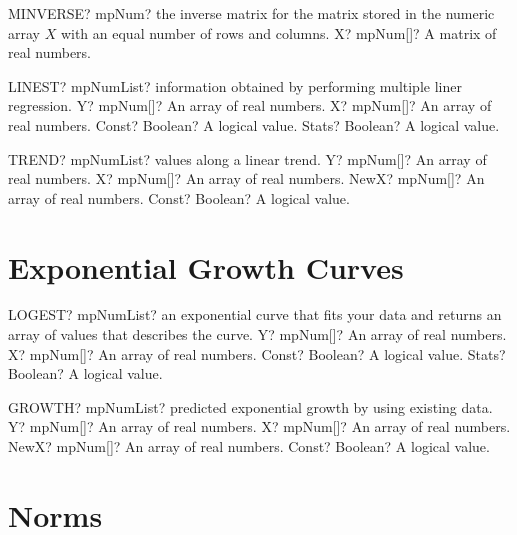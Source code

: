 \documentclass[12pt,a4paper,openany]{book}
\begin{document}
\begin{mpFunctionsExtract}
\mpWorksheetFunctionOneNotImplemented
{MINVERSE? mpNum? the  inverse matrix for the matrix stored in the numeric array  $X$ with an equal number of rows and columns.}
{X? mpNum[]? A matrix of real numbers.}
\end{mpFunctionsExtract}

\begin{mpFunctionsExtract}
\mpWorksheetFunctionFourNotImplemented
{LINEST? mpNumList? information obtained by performing multiple liner regression.}
{Y? mpNum[]? An array of real numbers.}
{X? mpNum[]? An array of real numbers.}
{Const? Boolean? A logical value.}
{Stats? Boolean? A logical value.}
\end{mpFunctionsExtract}

\begin{mpFunctionsExtract}
\mpWorksheetFunctionFourNotImplemented
{TREND? mpNumList? values along a linear trend.}
{Y? mpNum[]? An array of real numbers.}
{X? mpNum[]? An array of real numbers.}
{NewX? mpNum[]? An array of real numbers.}
{Const? Boolean? A logical value.}
\end{mpFunctionsExtract}

\section{Exponential Growth Curves}

\begin{mpFunctionsExtract}
\mpWorksheetFunctionFourNotImplemented
{LOGEST? mpNumList? an exponential curve that fits your data and returns an array of values that describes the curve.}
{Y? mpNum[]? An array of real numbers.}
{X? mpNum[]? An array of real numbers.}
{Const? Boolean? A logical value.}
{Stats? Boolean? A logical value.}
\end{mpFunctionsExtract}

\begin{mpFunctionsExtract}
\mpWorksheetFunctionFourNotImplemented
{GROWTH? mpNumList? predicted exponential growth by using existing data.}
{Y? mpNum[]? An array of real numbers.}
{X? mpNum[]? An array of real numbers.}
{NewX? mpNum[]? An array of real numbers.}
{Const? Boolean? A logical value.}
\end{mpFunctionsExtract}

\section{Norms}
\end{document}
